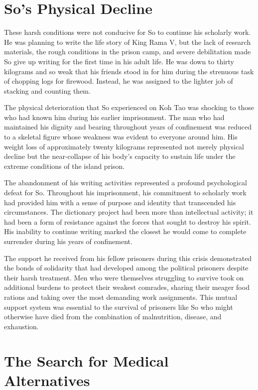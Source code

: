\documentclass[
  Letterpaper,
]{scrbook}
\begin{document}
\section{So's Physical Decline}\label{sos-physical-decline}

These harsh conditions were not conducive for So to continue his
scholarly work. He was planning to write the life story of King Rama V,
but the lack of research materials, the rough conditions in the prison
camp, and severe debilitation made So give up writing for the first time
in his adult life. He was down to thirty kilograms and so weak that his
friends stood in for him during the strenuous task of chopping logs for
firewood. Instead, he was assigned to the lighter job of stacking and
counting them.

The physical deterioration that So experienced on Koh Tao was shocking
to those who had known him during his earlier imprisonment. The man who
had maintained his dignity and bearing throughout years of confinement
was reduced to a skeletal figure whose weakness was evident to everyone
around him. His weight loss of approximately twenty kilograms
represented not merely physical decline but the near-collapse of his
body's capacity to sustain life under the extreme conditions of the
island prison.

The abandonment of his writing activities represented a profound
psychological defeat for So. Throughout his imprisonment, his commitment
to scholarly work had provided him with a sense of purpose and identity
that transcended his circumstances. The dictionary project had been more
than intellectual activity; it had been a form of resistance against the
forces that sought to destroy his spirit. His inability to continue
writing marked the closest he would come to complete surrender during
his years of confinement.

The support he received from his fellow prisoners during this crisis
demonstrated the bonds of solidarity that had developed among the
political prisoners despite their harsh treatment. Men who were
themselves struggling to survive took on additional burdens to protect
their weakest comrades, sharing their meager food rations and taking
over the most demanding work assignments. This mutual support system was
essential to the survival of prisoners like So who might otherwise have
died from the combination of malnutrition, disease, and exhaustion.

\section{The Search for Medical
Alternatives}\label{the-search-for-medical-alternatives}
\end{document}
